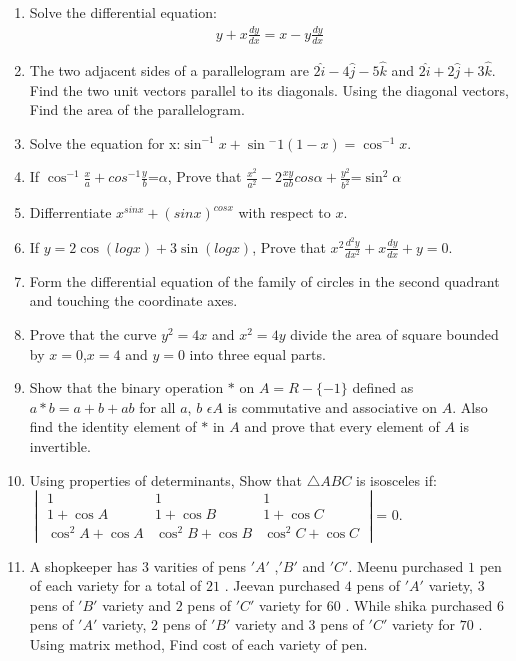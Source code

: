 \documentclass{article}
\begin{document}
\begin{enumerate}
\item Solve the differential equation:
	\begin{align*}
		y + x \frac{dy}{dx} = x - y \frac{dy}{dx}
	\end{align*}
\item The two adjacent sides of a parallelogram are  $ 2\hat{i}-4\hat{j}-5\hat{k} $ and $2\hat{i}+2\hat{j}+3\hat{k} $. Find the two unit vectors parallel to its diagonals. Using the diagonal vectors, Find the area of the parallelogram.
\item Solve the equation for x:$\sin^{-1}x+\sin{^-1}(1-x) = \cos^{-1}x$.
 \item If $\cos^{-1}\frac{x}{a}+cos^{-1}\frac{y}{b}$=$\alpha$, Prove that $\frac{x^2}{a^2}-2\frac{xy}{ab}cos\alpha+\frac{y^2}{b^2}$=$\sin^2\alpha$
 \item Differrentiate $x^{sinx}+(sinx)^{cosx}$ with respect to $x$.
 \item If $ y=2\cos(logx)+3\sin(logx)$, Prove that $x^2\frac{d^2y}{dx^2}+x\frac{dy}{dx}+y=0$.
 \item Form the differential equation of the family of circles in the second quadrant and touching the coordinate axes.
 \item Prove that the curve $y^2=4x$ and $x^2=4y$ divide the area of square bounded by $x=0$,$x=4$ and $y=0$ into three equal parts.
 \item Show that the binary operation $*$ on  $A=R-\{-1\}$ defined as $a*b =a+b+ab$ for all $a$, $b$ $\epsilon A$ is commutative and associative on $A$. Also find the identity element of $*$ in $A$ and prove that every element of $A$ is invertible.
 \item Using properties of determinants, Show that $\triangle ABC$ is isosceles if: \\
$\begin{vmatrix}1 & 1 & 1 \\1 + \cos A & 1 + \cos B & 1 + \cos C \\\cos^2 A + \cos A & \cos^2 B + \cos B & \cos^2 C + \cos C
\end{vmatrix}$= $0$.
 \item A shopkeeper has $3$ varities of pens $'A'$ ,$'B'$ and $'C'$. Meenu purchased $1$ pen of each variety for a total of \rupee $21$ . Jeevan purchased $4$ pens of $'A'$ variety, $3$ pens of $'B'$ variety and $2$ pens of $'C'$ variety for \rupee $60$ . While shika purchased $6$ pens of $'A'$ variety, $2$ pens of $'B'$ variety and $3$ pens of $'C'$ variety for \rupee $70$ . Using matrix method, Find cost of each variety of pen.

\end{enumerate}
\end{document}
